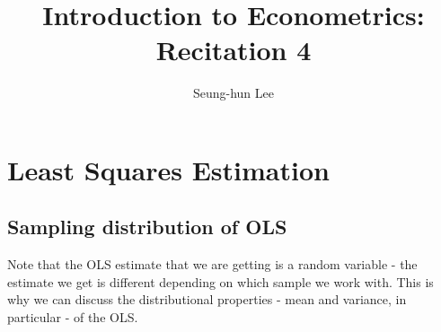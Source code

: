 \documentclass[12pt]{article}
\title{Introduction to Econometrics: Recitation 4}
\theoremstyle{definition}
\theoremstyle{property}
\theoremstyle{assumption}
\theoremstyle{example}
\theoremstyle{comment}
\begin{document}
\linespread{1.25}
\author{Seung-hun Lee}
\date{}
\maketitle



\section{Least Squares Estimation}

\subsection{Sampling distribution of OLS}
Note that the OLS estimate that we are getting is a random variable - the estimate we get is different depending on which sample we work with. This is why we can discuss the distributional properties - mean and variance, in particular - of the OLS. 
\end{document}
